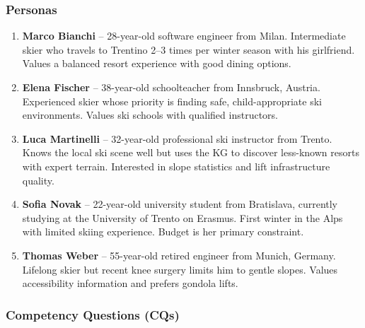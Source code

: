 \subsubsection{Personas}

\begin{enumerate}
    \item \textbf{Marco Bianchi} -- 28-year-old software engineer from Milan. Intermediate skier who travels to Trentino 2--3 times per winter season with his girlfriend. Values a balanced resort experience with good dining options.

    \item \textbf{Elena Fischer} -- 38-year-old schoolteacher from Innsbruck, Austria. Experienced skier whose priority is finding safe, child-appropriate ski environments. Values ski schools with qualified instructors.

    \item \textbf{Luca Martinelli} -- 32-year-old professional ski instructor from Trento. Knows the local ski scene well but uses the KG to discover less-known resorts with expert terrain. Interested in slope statistics and lift infrastructure quality.

    \item \textbf{Sofia Novak} -- 22-year-old university student from Bratislava, currently studying at the University of Trento on Erasmus. First winter in the Alps with limited skiing experience. Budget is her primary constraint.

    \item \textbf{Thomas Weber} -- 55-year-old retired engineer from Munich, Germany. Lifelong skier but recent knee surgery limits him to gentle slopes. Values accessibility information and prefers gondola lifts.
\end{enumerate}

\subsubsection{Competency Questions (CQs)}

